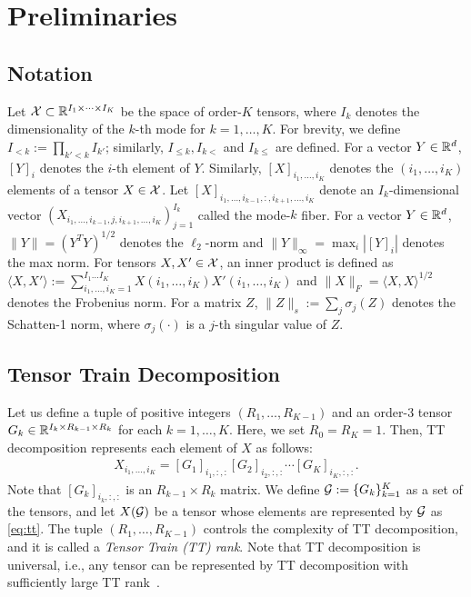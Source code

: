 \section{Preliminaries}

\subsection{Notation}

Let $\mathcal{X} \subset \mathbb{R}^{I_1 \times \cdots \times I_K}$ be the space of
order-$K$ tensors, where $I_k$ denotes the dimensionality of the $k$-th
mode for $k=1,\dots,K$.  For brevity, we define
$I_{<k} := \prod_{k'<k}I_{k'}$; similarly, $I_{\leq k}, I_{k<}$ and
$I_{k \leq}$ are defined.  For a vector $Y \in \mathbb{R}^d$, $[Y]_i$ denotes
the $i$-th element of $Y$.  Similarly, $[X]_{i_1,\ldots,i_K}$ denotes
the $(i_1,\ldots,i_K)$ elements of a tensor $X\in\mathcal{X}$. Let
$[X]_{i_1,\ldots,i_{k-1},:,i_{k+1},\ldots,i_K}$ denote an
$I_k$-dimensional vector
$(X_{i_1,\ldots,i_{k-1},j,i_{k+1},\ldots,i_K})_{j=1}^{I_k}$ called the
mode-$k$ fiber.  For a vector $Y \in \mathbb{R}^d$, $\|Y\| = (Y^T Y)^{1/2}$
denotes the $\ell_2$-norm and $\|Y\|_{\infty} = \max_i|[Y]_i|$ denotes
the max norm.  For tensors $X,X' \in \mathcal{X}$, an inner product is defined
as
$\langle X,X' \rangle := \sum_{i_1,\ldots,i_K =1}^{I_1 \dots I_K}
X(i_1,\ldots,i_K)X'(i_1,\ldots,i_K)$
and $\|X\|_{F} = \langle X,X \rangle^{1/2}$ denotes the Frobenius
norm.  For a matrix $Z$, $\|Z\|_s := \sum_{j} \sigma_{j}(Z)$ denotes
the Schatten-1 norm, where $\sigma_j(\cdot)$ is a $j$-th singular value
of $Z$.

\subsection{Tensor Train Decomposition}

Let us define a tuple of positive integers $(R_1, \ldots, R_{K-1})$
and an order-$3$ tensor $G_k \in \mathbb{R}^{I_k \times R_{k-1} \times R_k}$
for each $k = 1,\ldots,K$.  Here, we set $R_0 = R_K = 1$.  Then, TT
decomposition represents each element of $X$ as follows:
\begin{align}
	X_{i_1,\ldots,i_K} = [G_1]_{i_1,:,:} [G_2]_{i_2,:,:} \cdots [G_K]_{i_K,:,:}. \label{eq:tt}
\end{align}
Note that $[G_k]_{i_k,:,:}$ is an $R_{k-1} \times R_k$ matrix.  We
define $\mathcal{G} := \{G_k\}_{k=1}^K$ as a set of the tensors, and let $X(\mathcal{G})$
be a tensor whose elements are represented by $\mathcal{G}$ as
\eqref{eq:tt}.  The tuple $(R_1, \ldots, R_{K-1})$ controls
the complexity of TT decomposition, and it is called a \textit{Tensor
  Train (TT) rank}.  Note that TT decomposition is universal, i.e.,
any tensor can be represented by TT decomposition with sufficiently
large TT rank~\cite{oseledets2010tt}.


